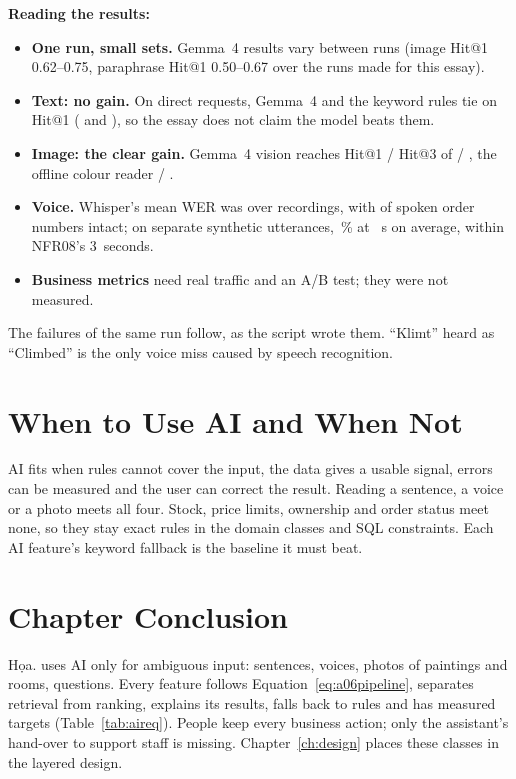 \textbf{Reading the results:}
\begin{itemize}
\item \textbf{One run, small sets.} Gemma~4 results vary between runs (image Hit@1 0.62--0.75, paraphrase Hit@1
      0.50--0.67 over the runs made for this essay).
\item \textbf{Text: no gain.} On direct requests, Gemma~4 and the keyword rules tie on Hit@1 (\evTextGemmaHitOne{}
      and \evTextRulesHitOne{}), so the essay does not claim the model beats them.
\item \textbf{Image: the clear gain.} Gemma~4 vision reaches Hit@1 / Hit@3 of \evImageGemmaHitOne{} /
      \evImageGemmaSecond{}, the offline colour reader \evImageLocalHitOne{} / \evImageLocalSecond{}.
\item \textbf{Voice.} Whisper's mean WER was \evWhisperWer{} over \evWhisperRecordings{} recordings, with
      \evOrderKept{} of \evOrderTotal{} spoken order numbers intact; on \voiceUtterances{} separate synthetic
      utterances, \voiceWER\,\% at \voiceMeanSeconds~s on average, within NFR08's 3~seconds.
\item \textbf{Business metrics} need real traffic and an A/B test; they were not measured.
\end{itemize}
The failures of the same run follow, as the script wrote them. ``Klimt'' heard as ``Climbed'' is the only voice miss
caused by speech recognition.


\section{When to Use AI and When Not}\label{sec:3.13}

AI fits when rules cannot cover the input, the data gives a usable signal, errors can be measured and the user can
correct the result. Reading a sentence, a voice or a photo meets all four. Stock, price limits, ownership and order
status meet none, so they stay exact rules in the domain classes and SQL constraints. Each AI feature's keyword
fallback is the baseline it must beat.

\section{Chapter Conclusion}\label{sec:3.14}

Họa. uses AI only for ambiguous input: sentences, voices, photos of paintings and rooms, questions. Every feature
follows Equation~\ref{eq:a06pipeline}, separates retrieval from ranking, explains its results, falls back to rules and
has measured targets (Table~\ref{tab:aireq}). People keep every business action; only the assistant's hand-over to
support staff is missing. Chapter~\ref{ch:design} places these classes in the layered design.
